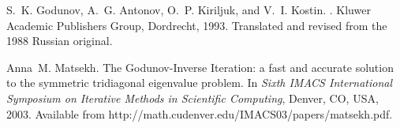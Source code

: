 \documentclass{report}
\begin{document}
\begin{thebibliography}{GAKK93}

S.~K. Godunov, A.~G. Antonov, O.~P. Kiriljuk, and V.~I. Kostin.
.
\newblock Kluwer Academic Publishers Group, Dordrecht, 1993.
\newblock Translated and revised from the 1988 Russian original.

Anna~M. Matsekh.
\newblock The {G}odunov-Inverse Iteration: {a} fast and accurate solution to
the symmetric tridiagonal eigenvalue problem.
\newblock In {\em Sixth IMACS International Symposium on Iterative Methods in
Scientific Computing}, Denver, CO, USA, 2003.
\newblock Available from http://math.cudenver.edu/IMACS03/papers/matsekh.pdf.

\end{thebibliography}
\end{document}
